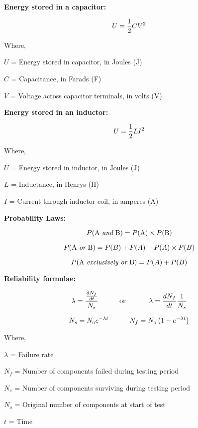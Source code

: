 

\noindent
{\bf Energy stored in a capacitor:}

$$U = {1 \over 2}CV^2$$

\noindent
Where,

$U$ = Energy stored in capacitor, in Joules (J)

$C$ = Capacitance, in Farads (F)

$V$ = Voltage across capacitor terminals, in volts (V)

\vskip 30pt

\noindent
{\bf Energy stored in an inductor:}

$$U = {1 \over 2}LI^2$$

\noindent
Where,

$U$ = Energy stored in inductor, in Joules (J)

$L$ = Inductance, in Henrys (H)

$I$ = Current through inductor coil, in amperes (A)

\vskip 30pt

\noindent
{\bf Probability Laws:}

$$P(\hbox{A {\it and} B}) = P(\hbox{A}) \times P(\hbox{B})$$

$$P(\hbox{A {\it or} B}) = P(B) + P(A) - P(A) \times P(B)$$

$$P(\hbox{A {\it exclusively or} B}) = P(A) + P(B)$$

\vskip 10pt

\noindent
{\bf Reliability formulae:}

$$\lambda = {{dN_f \over dt} \over N_s} \hbox{\hskip 30pt or \hskip 30pt} \lambda = {{dN_f \over dt} {1 \over N_s}}$$

$$N_{s} = N_o e^{-\lambda t} \hskip 30pt N_{f} = N_o \left(1 - e^{-\lambda t}\right)$$

\noindent
Where,

$\lambda$ = Failure rate

$N_f$ = Number of components failed during testing period

$N_s$ = Number of components surviving during testing period

$N_o$ = Original number of components at start of test

$t$ = Time

\vskip 10pt


